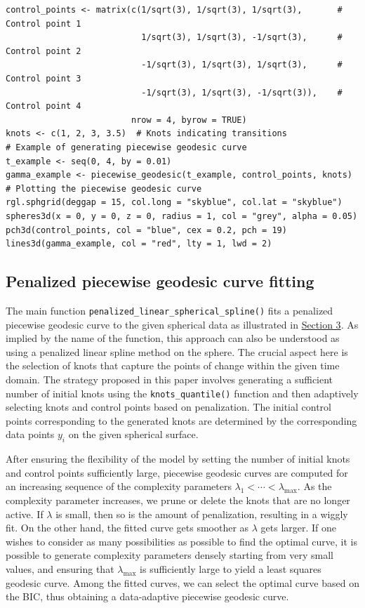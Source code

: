 \begin{verbatim}
control_points <- matrix(c(1/sqrt(3), 1/sqrt(3), 1/sqrt(3),       # Control point 1
                           1/sqrt(3), 1/sqrt(3), -1/sqrt(3),      # Control point 2
                           -1/sqrt(3), 1/sqrt(3), 1/sqrt(3),      # Control point 3
                           -1/sqrt(3), 1/sqrt(3), -1/sqrt(3)),    # Control point 4
                         nrow = 4, byrow = TRUE)
knots <- c(1, 2, 3, 3.5)  # Knots indicating transitions
# Example of generating piecewise geodesic curve
t_example <- seq(0, 4, by = 0.01)
gamma_example <- piecewise_geodesic(t_example, control_points, knots)
# Plotting the piecewise geodesic curve
rgl.sphgrid(deggap = 15, col.long = "skyblue", col.lat = "skyblue")
spheres3d(x = 0, y = 0, z = 0, radius = 1, col = "grey", alpha = 0.05)
pch3d(control_points, col = "blue", cex = 0.2, pch = 19)
lines3d(gamma_example, col = "red", lty = 1, lwd = 2)
\end{verbatim}

\subsection*{Penalized piecewise geodesic curve fitting}\label{penalized-piecewise-geodesic-curve-fitting}

The main function \texttt{penalized\_linear\_spherical\_spline()} fits a penalized piecewise geodesic curve to the given spherical data as illustrated in \hyperref[ppgc]{Section 3}. As implied by the name of the function, this approach can also be understood as using a penalized linear spline method on the sphere. The crucial aspect here is the selection of knots that capture the points of change within the given time domain. The strategy proposed in this paper involves generating a sufficient number of initial knots using the \texttt{knots\_quantile()} function and then adaptively selecting knots and control points based on penalization. The initial control points corresponding to the generated knots are determined by the corresponding data points \(y_i\) on the given spherical surface.

After ensuring the flexibility of the model by setting the number of initial knots and control points sufficiently large, piecewise geodesic curves are computed for an increasing sequence of the complexity parameters \(\lambda_1 < \cdots < \lambda_{\text{max}}\). As the complexity parameter increases, we prune or delete the knots that are no longer active. If \(\lambda\) is small, then so is the amount of penalization, resulting in a wiggly fit. On the other hand, the fitted curve gets smoother as \(\lambda\) gets larger. If one wishes to consider as many possibilities as possible to find the optimal curve, it is possible to generate complexity parameters densely starting from very small values, and ensuring that \(\lambda_{\text{max}}\) is sufficiently large to yield a least squares geodesic curve. Among the fitted curves, we can select the optimal curve based on the BIC, thus obtaining a data-adaptive piecewise geodesic curve.

